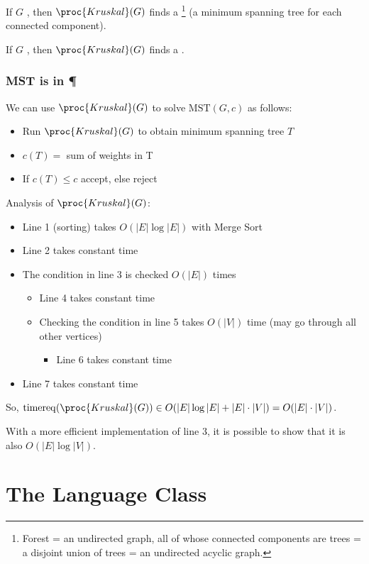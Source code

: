 \documentclass[a4paper]{report}
\newcommand{\bookref}[3]{\marginpar{\faBook{}~#1\\Chapter #2\\Section #3}}
\theoremstyle{definition}
\DeclareMathOperator*{\treq}{timereq}
\begin{document}
If $G$ , then $\proc{Kruskal}(G)$ finds a \footnote{Forest = an undirected graph, all of whose connected components are trees = a disjoint union of trees = an undirected acyclic graph.} (a minimum spanning tree for each connected component).

If $G$ , then $\proc{Kruskal}(G)$ finds a .

\section{MST is in \P}
\bookref{ER}{28}{28.1.6}
We can use $\proc{Kruskal}(G)$ to solve $\text{MST}(G, c)$ as follows:
\begin{itemize}
\item Run $\proc{Kruskal}(G)$ to obtain minimum spanning tree $T$
\item $c(T) =$ sum of weights in T
\item If $c(T) \leq c$ accept, else reject
\end{itemize}

Analysis of $\proc{Kruskal}(G)$:
\begin{itemize}
\item Line 1 (sorting) takes $O(|E| \log |E|)$ with Merge Sort
\item Line 2 takes constant time
\item The condition in line 3 is checked $O(|E|)$ times
\begin{itemize}
\item Line 4 takes constant time
\item Checking the condition in line 5 takes $O(|V|)$ time (may go through all other vertices)
\begin{itemize}
\item Line 6 takes constant time
\end{itemize}
\end{itemize}
\item Line 7 takes constant time
\end{itemize}

So, $\treq(\proc{Kruskal}(G)) \in O(|E|\log|E| + |E|\cdot|V|) = O(|E|\cdot|V|)$.

With a more efficient implementation of line 3, it is possible to show that it is also $O(|E| \log |V|)$.


\part{The Language Class \NP}
\end{document}

